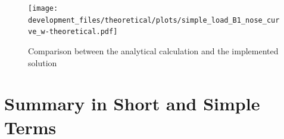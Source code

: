 \begin{figure}[htbp!]
        \centering
        \texttt{[image: development\_files/theoretical/plots/simple\_load\_B1\_nose\_curve\_w-theoretical.pdf]}
        \caption[Comparison between the analytical calculation and the implemented solution]{Comparison between the analytical calculation and the implemented solution}
        \label{fig:nose-curve-simple-comp}
\end{figure}



\section{Summary in Short and Simple Terms}